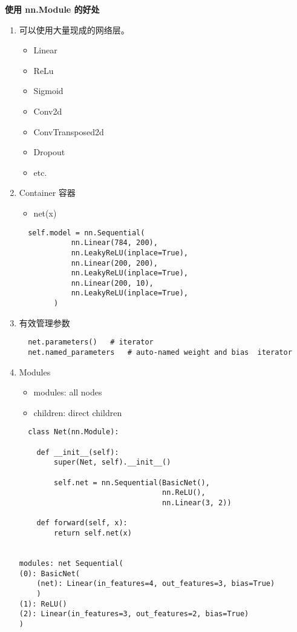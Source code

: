 \textbf{使用 nn.Module 的好处}
\begin{enumerate}
  \item 可以使用大量现成的网络层。
  \begin{itemize}
    \item Linear
    \item ReLu
    \item Sigmoid
    \item Conv2d
    \item ConvTransposed2d
    \item Dropout
    \item etc.
  \end{itemize}
  \item Container 容器
  \begin{itemize}
    \item net(x)
  \end{itemize}
  \begin{lstlisting}
  self.model = nn.Sequential(
            nn.Linear(784, 200),
            nn.LeakyReLU(inplace=True),
            nn.Linear(200, 200),
            nn.LeakyReLU(inplace=True),
            nn.Linear(200, 10),
            nn.LeakyReLU(inplace=True),
        )
  \end{lstlisting}
  \item 有效管理参数
  \begin{lstlisting}
  net.parameters()   # iterator
  net.named_parameters   # auto-named weight and bias  iterator
  \end{lstlisting}
  \item Modules
  \begin{itemize}
    \item modules: all nodes
    \item children: direct children
  \end{itemize}
  \begin{lstlisting}
  class Net(nn.Module):

    def __init__(self):
        super(Net, self).__init__()

        self.net = nn.Sequential(BasicNet(),
                                 nn.ReLU(),
                                 nn.Linear(3, 2))

    def forward(self, x):
        return self.net(x)


modules: net Sequential(
(0): BasicNet(
    (net): Linear(in_features=4, out_features=3, bias=True)
    )
(1): ReLU()
(2): Linear(in_features=3, out_features=2, bias=True)
)


\end{lstlisting}
\end{enumerate}
